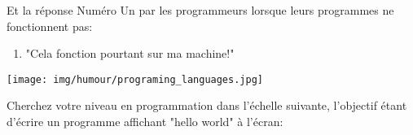 	Et la réponse Numéro Un par les programmeurs lorsque leurs programmes ne fonctionnent pas:
	\begin{enumerate}
		\item "Cela fonction pourtant sur ma machine!"		
	\end{enumerate}


	\begin{center}\underline{\hspace{5 cm}}\end{center}	
	
	\begin{center}
	\texttt{[image: img/humour/programing\_languages.jpg]}
	\end{center}
	
Cherchez votre niveau en programmation dans l'échelle suivante, l'objectif étant d'écrire un programme affichant "hello world" à l'écran:

